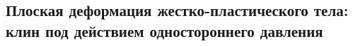 

\subsection{Плоская деформация жестко-пластического тела: клин под действием одностороннего давления}



